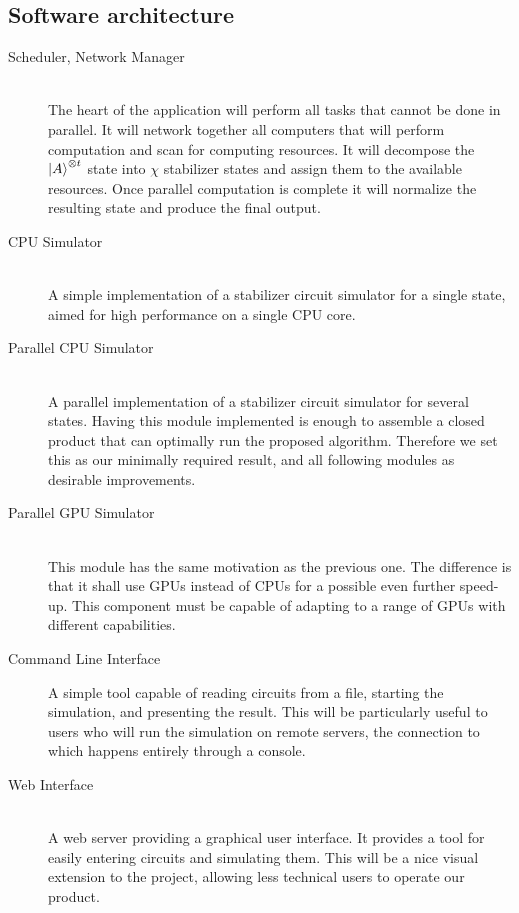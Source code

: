\documentclass[11pt]{article}
\begin{document}
\begin{multicols}{2}
\subsection*{Software architecture}


\begin{description}
    \item[Scheduler, Network Manager] \hfill \\
        The heart of the application will perform all tasks that cannot be done in parallel. It will network together all computers that will perform computation and scan for computing resources. It will decompose the ${\left\vert{A}\right\rangle}^{\otimes t}$ state into $\chi$ stabilizer states and assign them to the available resources. Once parallel computation is complete it will normalize the resulting state and produce the final output.
    \item[CPU Simulator] \hfill \\
        A simple implementation of a stabilizer circuit simulator for a single state, aimed for high performance on a single CPU core.
    \item[Parallel CPU Simulator] \hfill \\
        A parallel implementation of a stabilizer circuit simulator for several states. Having this module implemented is enough to assemble a closed product that can optimally run the proposed algorithm. Therefore we set this as our minimally required result, and all following modules as desirable improvements.
    \item[Parallel GPU Simulator] \hfill \\
        This module has the same motivation as the previous one. The difference is that it shall use GPUs instead of CPUs for a possible even further speed-up. This component must be capable of adapting to a range of GPUs with different capabilities.
    \item[Command Line Interface]
        A simple tool capable of reading circuits from a file, starting the simulation, and presenting the result. This will be particularly useful to users who will run the simulation on remote servers, the connection to which happens entirely through a console.
    \item[Web Interface] \hfill \\
        A web server providing a graphical user interface. It provides a tool for easily entering circuits and simulating them. This will be a nice visual extension to the project, allowing less technical users to operate our product.
\end{description}


\end{multicols}
\end{document}
